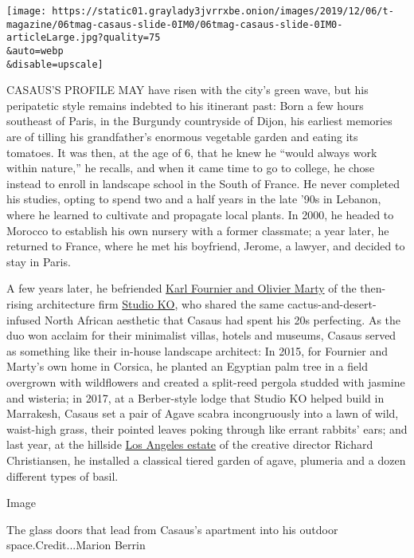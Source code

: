 \texttt{[image: https://static01.graylady3jvrrxbe.onion/images/2019/12/06/t-magazine/06tmag-casaus-slide-0IM0/06tmag-casaus-slide-0IM0-articleLarge.jpg?quality=75\\\&auto=webp\\\&disable=upscale]}

CASAUS'S PROFILE MAY have risen with the city's green wave, but his
peripatetic style remains indebted to his itinerant past: Born a few
hours southeast of Paris, in the Burgundy countryside of Dijon, his
earliest memories are of tilling his grandfather's enormous vegetable
garden and eating its tomatoes. It was then, at the age of 6, that he
knew he ``would always work within nature,'' he recalls, and when it
came time to go to college, he chose instead to enroll in landscape
school in the South of France. He never completed his studies, opting to
spend two and a half years in the late '90s in Lebanon, where he learned
to cultivate and propagate local plants. In 2000, he headed to Morocco
to establish his own nursery with a former classmate; a year later, he
returned to France, where he met his boyfriend, Jerome, a lawyer, and
decided to stay in Paris.

A few years later, he befriended
\href{https://www.nytimes3xbfgragh.onion/2015/09/23/t-magazine/minimalism-design-studio-ko.html}{Karl
Fournier and Olivier Marty} of the then-rising architecture firm
\href{http://www.studioko.fr/\#en-intro}{Studio KO}, who shared the same
cactus-and-desert-infused North African aesthetic that Casaus had spent
his 20s perfecting. As the duo won acclaim for their minimalist villas,
hotels and museums, Casaus served as something like their in-house
landscape architect: In 2015, for Fournier and Marty's own home in
Corsica, he planted an Egyptian palm tree in a field overgrown with
wildflowers and created a split-reed pergola studded with jasmine and
wisteria; in 2017, at a Berber-style lodge that Studio KO helped build
in Marrakesh, Casaus set a pair of Agave scabra incongruously into a
lawn of wild, waist-high grass, their pointed leaves poking through like
errant rabbits' ears; and last year, at the hillside
\href{https://www.nytimes3xbfgragh.onion/2018/09/14/t-magazine/los-angeles-dream-house-flamingo-estate.html}{Los
Angeles estate} of the creative director Richard Christiansen, he
installed a classical tiered garden of agave, plumeria and a dozen
different types of basil.

Image

The glass doors that lead from Casaus's apartment into his outdoor
space.Credit...Marion Berrin

